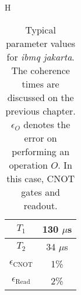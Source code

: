     \begin{table}{H}
      \begin{center}
        \begin{tabular}{| c | c |}
          \hline 
          $T_1$ & 130 $\mu$s \\
          \hline
          $T_2$ & 34 $\mu$s \\
          \hline
          $\epsilon_{\text{CNOT}}$ & 1\% \\
          \hline
          $\epsilon_{\text{Read}}$ & 2\% \\
          \hline
        \end{tabular}
      \end{center}
      \caption{Typical parameter values for \textit{ibmq jakarta}. The coherence times are discussed on the previous chapter. $\epsilon_O$ denotes the error on performing an operation $O$. In this case, CNOT gates and readout.}
      \label{tab:jakartaParams}
    \end{table}

